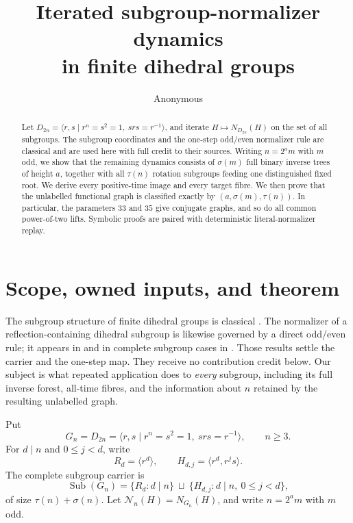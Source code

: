 \documentclass[10pt,a4paper]{amsart}
\title[Dihedral normalizer dynamics]{Iterated subgroup-normalizer dynamics\\
in finite dihedral groups}
\author{Anonymous}
\date{}
\theoremstyle{remark}
\newcommand{\Sub}{\operatorname{Sub}}
\begin{document}
\begin{abstract}
Let \(D_{2n}=\langle r,s\mid r^n=s^2=1,\ srs=r^{-1}\rangle\), and
iterate \(H\mapsto N_{D_{2n}}(H)\) on the set of all subgroups.  The subgroup
coordinates and the one-step odd/even normalizer rule are classical and are
used here with full credit to their sources.  Writing \(n=2^a m\) with
\(m\) odd, we show that the remaining dynamics consists of
\(\sigma(m)\) full binary inverse trees of height \(a\), together with all
\(\tau(n)\) rotation subgroups feeding one distinguished fixed root.  We
derive every positive-time image and every target fibre.  We then prove that
the unlabelled functional graph is classified exactly by
\((a,\sigma(m),\tau(n))\).  In particular, the parameters \(33\) and \(35\)
give conjugate graphs, and so do all common power-of-two lifts.  Symbolic
proofs are paired with deterministic literal-normalizer replay.
\end{abstract}

\maketitle

\section{Scope, owned inputs, and theorem}

The subgroup structure of finite dihedral groups is classical
\citep{Cavior1975,ConradDihedralII}.  The normalizer of a
reflection-containing dihedral subgroup is likewise governed by a direct
odd/even rule; it appears in \citet{Frenkel2003} and in complete subgroup
cases in \citet{ShelashEtAl2023}.  Those results settle the carrier and the
one-step map.  They receive no contribution credit below.  Our subject is
what repeated application does to \emph{every} subgroup, including its full
inverse forest, all-time fibres, and the information about \(n\) retained by
the resulting unlabelled graph.

Put
\[
G_n=D_{2n}=\langle r,s\mid r^n=s^2=1,\ srs=r^{-1}\rangle,\qquad n\geq3.
\]
For \(d\mid n\) and \(0\leq j<d\), write
\[
R_d=\langle r^d\rangle,\qquad
H_{d,j}=\langle r^d,r^j s\rangle.
\]
The complete subgroup carrier is
\[
\Sub(G_n)=\{R_d:d\mid n\}\ \sqcup\
\{H_{d,j}:d\mid n,\ 0\leq j<d\},                       \tag{1}\label{eq:carrier}
\]
of size \(\tau(n)+\sigma(n)\).  Let
\(\mathcal N_n(H)=N_{G_n}(H)\), and write
\(n=2^a m\) with \(m\) odd.
\end{document}
